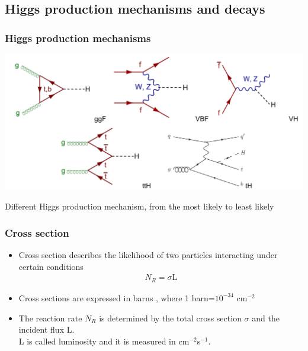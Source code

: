 \documentclass[11pt]{beamer}
\newcommand{\nologo}{\setbeamertemplate{logo}{}}
\begin{document}
{\nologo
\begin{frame}
\subsection{Higgs production mechanisms and decays}
\frametitle{Higgs production mechanisms}

\begin{center}
\includegraphics[scale=0.4]{figures/pg.png}
\end{center}
\small{Different Higgs production mechanism, from the most likely to least likely}
\end{frame}
}

\begin{frame}
\frametitle{Cross section}
\begin{itemize}
\item Cross section describes the likelihood of two particles interacting under certain conditions\cite{1}\cite{6}
\begin{align}
N_R=\sigma \text{L}
\end{align}
\item Cross sections are expressed in barns , where 1 barn=$10^{-34}$ cm$^{-2}$ 
\item The reaction rate $N_R$ is determined by the total cross section $\sigma$ and the incident flux L.\\
L is called luminosity and it is measured in cm$^{-2}$s$^{-1}$.\cite{6}
\end{itemize}
\end{frame}
\end{document}
